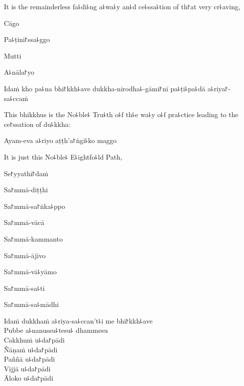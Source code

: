 \begin{english}
  It is the remainderless fa꜕di꜕ng a꜕wa꜕y an꜕d ce꜕ssa꜕tion of th꜓at very cr꜕aving,
\end{english}

Cāgo


Pa꜕ṭini꜓ssa꜕ggo


Mutti


A꜕nāla꜓yo


\ifaivedition
\clearpage
\fi

Idaṁ kho pa꜕na bhi꜓kkh꜕ave dukkha-nirodha꜕-gāmi꜓nī pa꜕ṭi꜕pa꜕dā a꜕riya꜓-sa꜕ccaṁ

\begin{english}
  This bhikkhus is the No꜕ble꜕ Tru꜕th o꜕f th꜕e wa꜕y o꜕f pra꜕ctice leading to the ce꜓ssation of du꜕kkha:
\end{english}

Ayam-eva a꜕riyo aṭṭh'a꜓ṅgi꜕ko maggo

\begin{english}
  It is just this No꜕ble꜕ E꜕ightfo꜕ld Path,
\end{english}

Se꜓yyathī꜓daṁ


Sa꜓mmā-diṭṭhi


Sa꜓mmā-sa꜓ṅka꜕ppo


Sa꜓mmā-vācā


Sa꜓mmā-kammanto


Sa꜓mmā-ājīvo


Sa꜓mmā-vā꜕yāmo


Sa꜓mmā-sa꜕ti


Sa꜓mmā-sa꜕mādhi


Idaṁ dukkhaṁ a꜕riya-sa꜕ccan't꜕i me bhi꜓kkh꜕ave\\
Pubbe a꜕nanussu꜕tesu꜕ dhammesu\\
Cakkhuṁ u꜕da꜓pādi\\
Ñāṇaṁ u꜕da꜓pādi\\
Paññā u꜕da꜓pādi\\
Vijjā u꜕da꜓pādi\\
Āloko u꜕da꜓pādi

